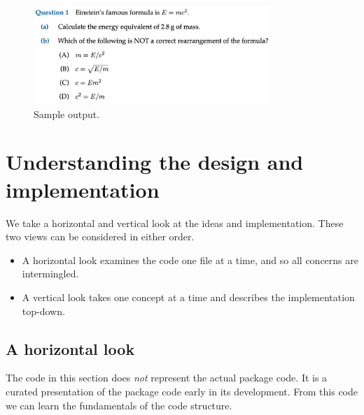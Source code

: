 \documentclass[11pt]{article}
\begin{document}
\begin{figure}
\begin{tcolorbox}
  \includegraphics[width=0.8\textwidth]{media/example1.png}
\end{tcolorbox}
\caption{Sample output.}
\label{fig:example1out}
\end{figure}




\section{Understanding the design and implementation}

We take a horizontal and vertical look at the ideas and implementation. These two views can be considered in either order.
\begin{itemize}
  \item A horizontal look examines the code one file at a time, and so all concerns are intermingled.
  \item A vertical look takes one concept at a time and describes the implementation top-down.
\end{itemize}


\subsection{A horizontal look}

The code in this section does \emph{not} represent the actual package code. It is a curated presentation of the package code early in its development. From this code we can learn the fundamentals of the code structure.
\end{document}
